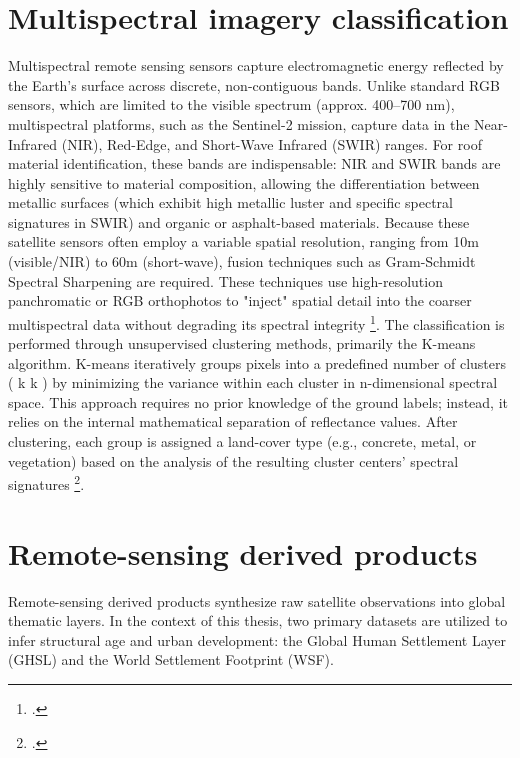 \begin{refsection}
\section{Multispectral imagery classification}
Multispectral remote sensing sensors capture electromagnetic energy reflected by the Earth's surface across discrete, non-contiguous bands. Unlike standard RGB sensors, which are limited to the visible spectrum (approx. 400–700 nm), multispectral platforms, such as the Sentinel-2 mission, capture data in the Near-Infrared (NIR), Red-Edge, and Short-Wave Infrared (SWIR) ranges.
For roof material identification, these bands are indispensable: NIR and SWIR bands are highly sensitive to material composition, allowing the differentiation between metallic surfaces (which exhibit high metallic luster and specific spectral signatures in SWIR) and organic or asphalt-based materials. Because these satellite sensors often employ a variable spatial resolution, ranging from 10m (visible/NIR) to 60m (short-wave), fusion techniques such as Gram-Schmidt Spectral Sharpening are required. These techniques use high-resolution panchromatic or RGB orthophotos to "inject" spatial detail into the coarser multispectral data without degrading its spectral integrity \footcite{braun_identification_2019}.
The classification is performed through unsupervised clustering methods, primarily the K-means algorithm. K-means iteratively groups pixels into a predefined number of clusters (
k
k
) by minimizing the variance within each cluster in n-dimensional spectral space. This approach requires no prior knowledge of the ground labels; instead, it relies on the internal mathematical separation of reflectance values. After clustering, each group is assigned a land-cover type (e.g., concrete, metal, or vegetation) based on the analysis of the resulting cluster centers' spectral signatures \footcite{marconcini_understanding_2021}.

\section{Remote-sensing derived products}

Remote-sensing derived products synthesize raw satellite observations into global thematic layers. In the context of this thesis, two primary datasets are utilized to infer structural age and urban development: the Global Human Settlement Layer (GHSL) and the World Settlement Footprint (WSF).


\end{refsection}
